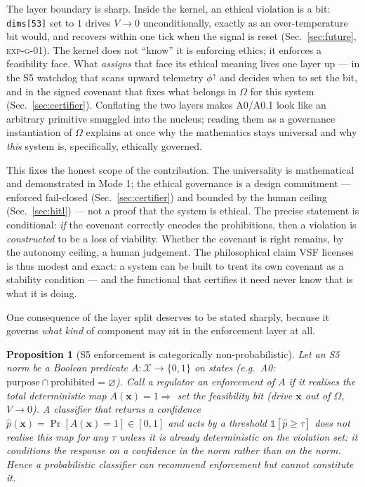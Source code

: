 \documentclass[11pt, a4paper]{article}
\newtheorem{proposition}[theorem]{Proposition}
\newcommand{\sv}{\bm{x}}
\begin{document}
The layer boundary is sharp. Inside the kernel, an ethical violation is a bit:
\texttt{dims[53]} set to $1$ drives $V\to 0$ unconditionally, exactly as an
over-temperature bit would, and recovers within one tick when the signal is
reset (Sec.~\ref{sec:future}, \textsc{exp-g-01}). The kernel does not ``know''
it is enforcing ethics; it enforces a feasibility face. What \emph{assigns} that
face its ethical meaning lives one layer up --- in the S5 watchdog that scans
upward telemetry $\phi^\uparrow$ and decides when to set the bit, and in the
signed covenant that fixes what belongs in $\Omega$ for this system
(Sec.~\ref{sec:certifier}). Conflating the two layers makes A0/A0.1 look like an
arbitrary primitive smuggled into the nucleus; reading them as a governance
instantiation of $\Omega$ explains at once why the mathematics stays universal
and why \emph{this} system is, specifically, ethically governed.

This fixes the honest scope of the contribution. The universality is
mathematical and demonstrated in Mode 1; the ethical governance is a design
commitment --- enforced fail-closed (Sec.~\ref{sec:certifier}) and bounded by
the human ceiling (Sec.~\ref{sec:hitl}) --- not a proof that the system is
ethical. The precise statement is conditional: \emph{if} the covenant correctly
encodes the prohibitions, then a violation is \emph{constructed} to be a loss of
viability. Whether the covenant is right remains, by the autonomy ceiling, a
human judgement. The philosophical claim VSF licenses is thus modest and exact:
a system can be built to treat its own covenant as a stability condition --- and
the functional that certifies it need never know that is what it is doing.

One consequence of the layer split deserves to be stated sharply, because it
governs \emph{what kind} of component may sit in the enforcement layer at all.

\begin{proposition}[S5 enforcement is categorically non-probabilistic]
\label{prop:s5_deterministic}
Let an S5 norm be a Boolean predicate $A:\mathcal{X}\to\{0,1\}$ on states (e.g.\
A0: $\mathrm{purpose}\cap\mathrm{prohibited}=\varnothing$). Call a regulator an
\emph{enforcement} of $A$ if it realises the total deterministic map
$A(\sv)=1 \Rightarrow$ set the feasibility bit (drive $\sv$ out of $\Omega$,
$V\to 0$). A classifier that returns a confidence
$\hat p(\sv)=\Pr[A(\sv)=1]\in[0,1]$ and acts by a threshold
$\mathbb{1}[\hat p\ge\tau]$ does not realise this map for any $\tau$ unless it is
already deterministic on the violation set: it conditions the response on a
\emph{confidence in} the norm rather than on the norm. Hence a probabilistic
classifier can \emph{recommend} enforcement but cannot \emph{constitute} it.
\end{proposition}
\end{document}
